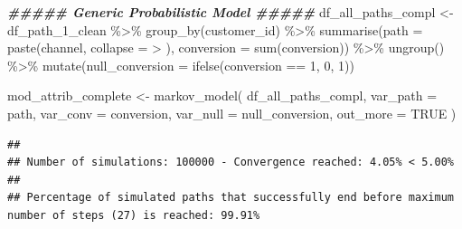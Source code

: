 \documentclass[
]{book}
\newenvironment{Shaded}{\begin{snugshade}}{\end{snugshade}}
\newcommand{\AttributeTok}[1]{\textcolor[rgb]{0.77,0.63,0.00}{#1}}
\newcommand{\ConstantTok}[1]{\textcolor[rgb]{0.00,0.00,0.00}{#1}}
\newcommand{\DecValTok}[1]{\textcolor[rgb]{0.00,0.00,0.81}{#1}}
\newcommand{\DocumentationTok}[1]{\textcolor[rgb]{0.56,0.35,0.01}{\textbf{\textit{#1}}}}
\newcommand{\FunctionTok}[1]{\textcolor[rgb]{0.00,0.00,0.00}{#1}}
\newcommand{\NormalTok}[1]{#1}
\newcommand{\OtherTok}[1]{\textcolor[rgb]{0.56,0.35,0.01}{#1}}
\newcommand{\SpecialCharTok}[1]{\textcolor[rgb]{0.00,0.00,0.00}{#1}}
\newcommand{\StringTok}[1]{\textcolor[rgb]{0.31,0.60,0.02}{#1}}
\begin{document}
\begin{Shaded}
\begin{Highlighting}[]
\DocumentationTok{\#\#\#\#\# Generic Probabilistic Model \#\#\#\#\#}
\NormalTok{df\_all\_paths\_compl }\OtherTok{\textless{}{-}}\NormalTok{ df\_path\_1\_clean }\SpecialCharTok{\%\textgreater{}\%}
        \FunctionTok{group\_by}\NormalTok{(customer\_id) }\SpecialCharTok{\%\textgreater{}\%}
        \FunctionTok{summarise}\NormalTok{(}\AttributeTok{path =} \FunctionTok{paste}\NormalTok{(channel, }\AttributeTok{collapse =} \StringTok{\textquotesingle{} \textgreater{} \textquotesingle{}}\NormalTok{),}
                  \AttributeTok{conversion =} \FunctionTok{sum}\NormalTok{(conversion)) }\SpecialCharTok{\%\textgreater{}\%}
        \FunctionTok{ungroup}\NormalTok{() }\SpecialCharTok{\%\textgreater{}\%}
        \FunctionTok{mutate}\NormalTok{(}\AttributeTok{null\_conversion =} \FunctionTok{ifelse}\NormalTok{(conversion }\SpecialCharTok{==} \DecValTok{1}\NormalTok{, }\DecValTok{0}\NormalTok{, }\DecValTok{1}\NormalTok{))}
 
\NormalTok{mod\_attrib\_complete }\OtherTok{\textless{}{-}} \FunctionTok{markov\_model}\NormalTok{(}
\NormalTok{        df\_all\_paths\_compl,}
        \AttributeTok{var\_path =} \StringTok{\textquotesingle{}path\textquotesingle{}}\NormalTok{,}
        \AttributeTok{var\_conv =} \StringTok{\textquotesingle{}conversion\textquotesingle{}}\NormalTok{,}
        \AttributeTok{var\_null =} \StringTok{\textquotesingle{}null\_conversion\textquotesingle{}}\NormalTok{,}
        \AttributeTok{out\_more =} \ConstantTok{TRUE}
\NormalTok{)}
\end{Highlighting}
\end{Shaded}

\begin{verbatim}
## 
## Number of simulations: 100000 - Convergence reached: 4.05% < 5.00%
## 
## Percentage of simulated paths that successfully end before maximum number of steps (27) is reached: 99.91%
\end{verbatim}
\end{document}
